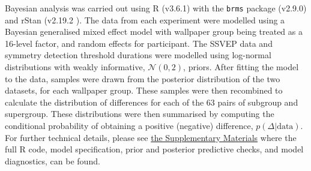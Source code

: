 \documentclass[11pt, twoside]{article}
\begin{document}
Bayesian analysis was carried out using R (v3.6.1) \citep{R} with the \texttt{brms} package (v2.9.0) \citep{burkner2017} and rStan (v2.19.2 \citep{rStan}). The data from each experiment were modelled using a Bayesian generalised mixed effect model with wallpaper group being treated as a 16-level factor, and random effects for participant. The SSVEP data and symmetry detection threshold durations were modelled using log-normal distributions with weakly informative, $ \mathcal{N}(0, 2)$, priors. After fitting the model to the data, samples were drawn from the posterior distribution of the two datasets, for each wallpaper group. These samples were then recombined to calculate the distribution of differences for each of the 63 pairs of subgroup and supergroup. These distributions were then summarised by computing the conditional probability of obtaining a positive (negative) difference, $p(\Delta | \text{data})$. For further technical details, please see \href{https://osf.io/f3ex8/}{the Supplementary Materials} where the full R code, model specification, prior and posterior predictive checks, and model diagnostics, can be found. 

\begin{multicols}{2}
\small
 

\end{multicols}
\end{document}
